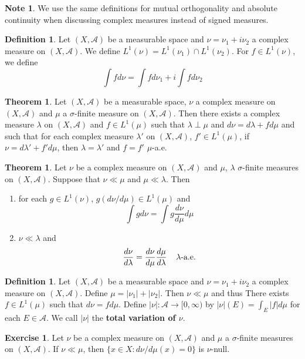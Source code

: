 \documentclass[12pt]{amsart}
\theoremstyle{definition}
\newtheorem{defn}[definition]{Definition}
\newtheorem{note}[definition]{Note}
\newtheorem{thm}[definition]{Theorem}
\newtheorem{ex}[definition]{Exercise}
\newcommand{\lam}{\lambda}
\newcommand{\sig}{\sigma}
\newcommand{\MA}{\mathcal{A}}
\newcommand{\Rg}{[0,\infty)}
\begin{document}
	\begin{note}
		We use the same definitions for mutual orthogonality and absolute continuity when discussing complex measures instead of signed measures.
	\end{note}
	
	\begin{defn}
		Let $(X,\MA)$ be a measurable space and $\nu = \nu_1 + i\nu_2$ a complex measure on $(X,\MA)$. We define $L^1(\nu) = L^1(\nu_1)\cap L^1(\nu_2)$. For $f \in L^1(\nu)$, we define $$\int f d\nu = \int fd\nu_1 + i \int f d \nu_2$$
	\end{defn}
	
	\begin{thm}
		Let $(X,\MA)$ be a measurable space, $\nu$ a complex measure on $(X, \MA)$ and $\mu$ a $\sig$-finite measure on $(X, \MA)$. Then there exists a  complex measure $\lambda$ on $(X, \MA)$ and $f \in L^1(\mu)$ such that $\lam \perp \mu$ and $d \nu = d \lam + f d\mu$ and such that for each complex measure $\lam '$ on $(X, \MA)$, $f' \in L^1(\mu)$, if $\nu = d \lam '+ f'd \mu$, then $\lam = \lam '$ and $f = f'$  $\mu$-a.e.
	\end{thm}
	
	\begin{thm}
		Let $\nu$ be a complex measure on $(X, \MA)$ and $\mu$, $\lam$ $\sig$-finite measures on $(X,\MA)$. Suppose that $\nu \ll \mu$ and $\mu \ll \lam$. Then 
		\begin{enumerate}
			\item for each $g \in L^1(\nu)$, $g(d\nu/d\mu) \in  L^1(\mu)$ and $$\int g d\nu = \int g \frac{d\nu}{d\mu} d\mu$$
			\item $\nu \ll \lam$ and $$\frac{d \nu}{d\lam} = \frac{d \nu}{d\mu} \frac{d\mu}{d\lam} \hspace{4mm} \lam \text{-a.e.}$$
		\end{enumerate}
	\end{thm}
	
	\begin{defn}Let $(X,\MA)$ be a measurable space and $\nu = \nu_1 + i \nu_2$ a complex measure on $(X, \MA)$. Define $\mu = |\nu_1| + |\nu_2|$. Then $\nu \ll \mu$ and thus There exists $f \in L^1(\mu)$ such that $d\nu = f d\mu$. Define $|\nu|: \MA \rightarrow \Rg$ by $|\nu|(E) = \int_E |f|d\mu$ for each $E \in \MA$. We call $|\nu|$ the \textbf{total variation of $\nu$}. 
	\end{defn}
	
	\begin{ex}
		Let $\nu$ be a complex measure on $(X, \MA)$ and $\mu$ a $\sig$-finite measures on $(X,\MA)$. If $\nu \ll \mu$, then $\{x \in X: d\nu / d \mu(x) = 0 \}$ is $\nu$-null.
	\end{ex}
	
\end{document}
